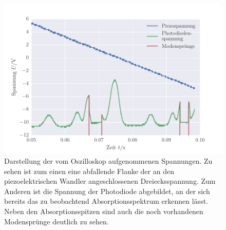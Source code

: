 \FloatBarrier
\begin{figure}[!h]
\centering
\includegraphics[scale=1]{../Grafiken/Filter_und_NDFilter.pdf}
\caption{Darstellung der vom Oszilloskop aufgenommenen Spannungen.
	 Zu sehen ist zum einen eine abfallende Flanke der an den piezoelektrischen Wandler
	 angeschlossenen Dreiecksspannung. Zum Anderen ist die Spannung der Photodiode abgebildet,
	 an der sich bereits das zu beobachtend Absorptionsspektrum erkennen lässt.
	 Neben den Absorptionsspitzen sind auch die noch vorhandenen Modensprünge deutlich zu 
	 sehen.\label{fig:filter_und_ndfilter}}
\end{figure}
\FloatBarrier